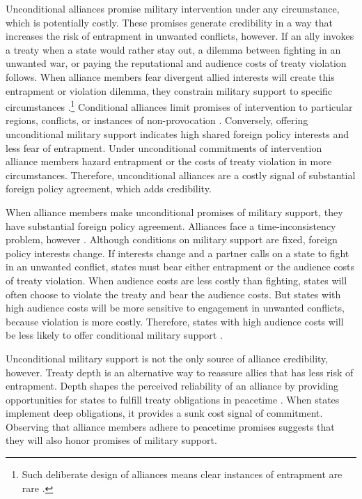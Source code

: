 \documentclass[12pt]{article}
\begin{document}
Unconditional alliances promise military intervention under any circumstance, which is potentially costly. 
These promises generate credibility in a way that increases the risk of entrapment in unwanted conflicts, however. 
If an ally invokes a treaty when a state would rather stay out, a dilemma between fighting in an unwanted war, or paying the reputational \citep{Gibler2008, Crescenzietal2012} and audience \citep{Fearon1997} costs of treaty violation follows.
When alliance members fear divergent allied interests will create this entrapment or violation dilemma, they constrain military support to specific circumstances \citep{Kim2011, Benson2012}.\footnote{Such deliberate design of alliances means clear instances of entrapment are rare \citep{Kim2011, Beckley2015}.} 
Conditional alliances limit promises of intervention to particular regions, conflicts, or instances of non-provocation \citep{Leedsetal2000}. 
Conversely, offering unconditional military support indicates high shared foreign policy interests and less fear of entrapment.
Under unconditional commitments of intervention alliance members hazard entrapment or the costs of treaty violation in more circumstances. 
Therefore, unconditional alliances are a costly signal of substantial foreign policy agreement, which adds credibility.  


When alliance members make unconditional promises of military support, they have substantial foreign policy agreement.
Alliances face a time-inconsistency problem, however \citep{LeedsSavun2007}. 
Although conditions on military support are fixed, foreign policy interests change. 
If interests change and a partner calls on a state to fight in an unwanted conflict, states must bear either entrapment or the audience costs of treaty violation.
When audience costs are less costly than fighting, states will often choose to violate the treaty and bear the audience costs.   
But states with high audience costs will be more sensitive to engagement in unwanted conflicts, because violation is more costly. 
Therefore, states with high audience costs will be less likely to offer conditional military support  \citep{Chibaetal2015}. 


Unconditional military support is not the only source of alliance credibility, however. 
Treaty depth is an alternative way to reassure allies that has less risk of entrapment. 
Depth shapes the perceived reliability of an alliance by providing opportunities for states to fulfill treaty obligations in peacetime \citep{Morrow1994}. 
When states implement deep obligations, it provides a sunk cost signal of commitment.
Observing that alliance members adhere to peacetime promises suggests that they will also honor promises of military support. 
\end{document}

